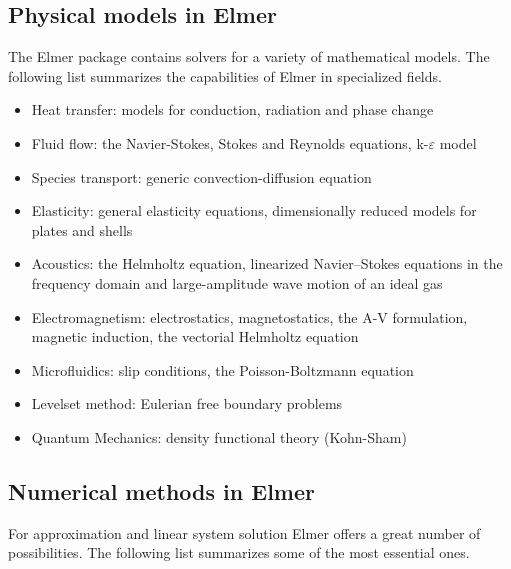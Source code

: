 \subsection*{Physical models in Elmer}
The Elmer package contains solvers for a variety of mathematical models.
The following list summarizes the capabilities of Elmer in specialized fields.
\begin{itemize}
  \item Heat transfer: models for conduction, radiation and phase change
  \item Fluid flow: the Navier-Stokes, Stokes and Reynolds equations, k-$\varepsilon$ model
  \item Species transport: generic convection-diffusion equation
  \item Elasticity: general elasticity equations, dimensionally reduced models for plates and shells
  \item Acoustics: the Helmholtz equation, linearized Navier--Stokes equations in the frequency domain and
    large-amplitude wave motion of an ideal gas
  \item Electromagnetism: electrostatics, magnetostatics, the A-V formulation, magnetic induction, the vectorial Helmholtz equation 
  \item Microfluidics: slip conditions, the Poisson-Boltzmann equation
  \item Levelset method: Eulerian free boundary problems 
  \item Quantum Mechanics: density functional theory (Kohn-Sham)
\end{itemize}

\subsection*{Numerical methods in Elmer}

For approximation and linear system solution Elmer offers a great number of possibilities.
The following list summarizes some of the most essential ones.

